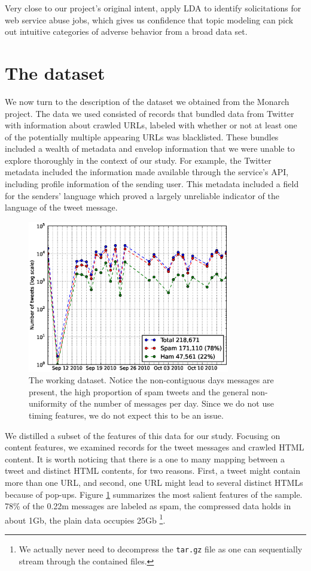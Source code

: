\documentclass[times, 11pt, twocolumn]{article}
\begin{document}
Very close to our project's original intent, \cite{Kim2011} apply LDA to identify solicitations 
for web service abuse jobs, which gives us confidence that topic modeling can pick out 
intuitive categories of adverse behavior from a broad data set. 

\section{The dataset}
We now turn to the description of the dataset we obtained from the Monarch project. The data 
we used consisted of records that bundled data from Twitter with information about crawled URLs, 
labeled with whether or not at least one of the potentially multiple appearing URLs was blacklisted.
These bundles included a wealth of metadata and envelop information that we were unable 
to explore thoroughly in the context of our study. For example, the Twitter metadata included 
the information made available through the service's API, including profile information of 
the sending user. This metadata included a field for the senders' language which proved 
a largely unreliable indicator of the language of the tweet message.

\begin{figure}[!h]\centering
	\includegraphics[width=8.8cm]{tweets_per_day.eps}
	\caption{The working dataset. Notice the non-contiguous days messages are present,
	the high proportion of spam tweets and the general non-uniformity of the number of
	messages per day. Since we do not use timing features, we do not expect this to
	be an issue.}
	\label{sample}
\end{figure}


We distilled a subset of the features of this data for our study. Focusing on content features, 
we examined records for the tweet messages and crawled HTML content. It is worth noticing that
there is a one to many mapping between a tweet and distinct HTML contents, for two reasons. First, 
a tweet might contain more than one URL, and second, one URL might lead to several distinct HTMLs
because of pop-ups. Figure \ref{sample} summarizes the most salient features of the sample. 78\% of the 0.22m
messages are labeled as spam, the compressed data holds in about 1Gb, the plain data occupies 25Gb
\footnote{We actually never need to decompress the \texttt{tar.gz} file as one can sequentially 
stream through the contained files.}.
\end{document}
